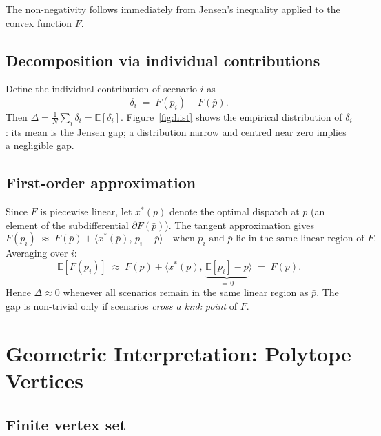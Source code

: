 \documentclass[11pt, a4paper]{article}
\theoremstyle{plain}
\theoremstyle{definition}
\newcommand{\E}{\mathbb{E}}
\newcommand{\pbar}{\bar{p}}
\newcommand{\xstar}{x^*}
\begin{document}
The non-negativity follows immediately from Jensen's inequality applied
to the convex function $F$.

\subsection{Decomposition via individual contributions}

Define the individual contribution of scenario $i$ as
\begin{equation}
  \delta_i \;=\; F(p_i) - F(\pbar).
\end{equation}
Then $\Delta = \frac{1}{N}\sum_i \delta_i = \E[\delta_i]$.
Figure~\ref{fig:hist} shows the empirical distribution of $\delta_i$:
its mean is the Jensen gap; a distribution narrow and centred near zero
implies a negligible gap.

\subsection{First-order approximation}

Since $F$ is piecewise linear, let $\xstar(\pbar)$ denote the optimal
dispatch at $\pbar$ (an element of the subdifferential $\partial F(\pbar)$).
The tangent approximation gives
\begin{equation}
  F(p_i)
  \;\approx\;
  F(\pbar) + \langle \xstar(\pbar),\, p_i - \pbar \rangle
  \quad
  \text{when $p_i$ and $\pbar$ lie in the same linear region of $F$.}
\end{equation}
Averaging over $i$:
\begin{equation}
  \E[F(p_i)]
  \;\approx\;
  F(\pbar) + \langle \xstar(\pbar),\, \underbrace{\E[p_i] - \pbar}_{=\,0} \rangle
  \;=\;
  F(\pbar).
\end{equation}
Hence $\Delta \approx 0$ whenever all scenarios remain in the same
linear region as $\pbar$.  The gap is non-trivial only if scenarios
\emph{cross a kink point} of $F$.

\section{Geometric Interpretation: Polytope Vertices}

\subsection{Finite vertex set}
\end{document}
